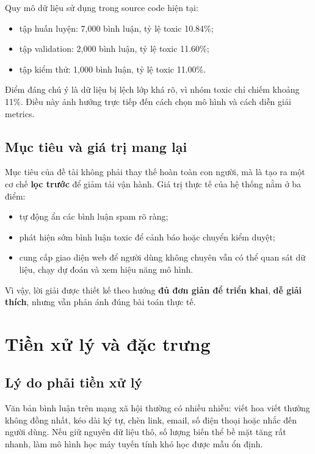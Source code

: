 \documentclass[12pt,a4paper]{article}
\begin{document}
Quy mô dữ liệu sử dụng trong source code hiện tại:
\begin{itemize}[leftmargin=1.2cm]
    \item tập huấn luyện: 7{,}000 bình luận, tỷ lệ toxic 10.84\%;
    \item tập validation: 2{,}000 bình luận, tỷ lệ toxic 11.60\%;
    \item tập kiểm thử: 1{,}000 bình luận, tỷ lệ toxic 11.00\%.
\end{itemize}

Điểm đáng chú ý là dữ liệu bị lệch lớp khá rõ, vì nhóm toxic chỉ chiếm khoảng 11\%. Điều này ảnh hưởng trực tiếp đến cách chọn mô hình và cách diễn giải metrics.

\subsection{Mục tiêu và giá trị mang lại}
Mục tiêu của đề tài không phải thay thế hoàn toàn con người, mà là tạo ra một cơ chế \textbf{lọc trước} để giảm tải vận hành. Giá trị thực tế của hệ thống nằm ở ba điểm:
\begin{itemize}[leftmargin=1.2cm]
    \item tự động ẩn các bình luận spam rõ ràng;
    \item phát hiện sớm bình luận toxic để cảnh báo hoặc chuyển kiểm duyệt;
    \item cung cấp giao diện web để người dùng không chuyên vẫn có thể quan sát dữ liệu, chạy dự đoán và xem hiệu năng mô hình.
\end{itemize}

Vì vậy, lời giải được thiết kế theo hướng \textbf{đủ đơn giản để triển khai}, \textbf{dễ giải thích}, nhưng vẫn phản ánh đúng bài toán thực tế.

\section{Tiền xử lý và đặc trưng}

\subsection{Lý do phải tiền xử lý}
Văn bản bình luận trên mạng xã hội thường có nhiều nhiễu: viết hoa viết thường không đồng nhất, kéo dài ký tự, chèn link, email, số điện thoại hoặc nhắc đến người dùng. Nếu giữ nguyên dữ liệu thô, số lượng biến thể bề mặt tăng rất nhanh, làm mô hình học máy tuyến tính khó học được mẫu ổn định.
\end{document}
